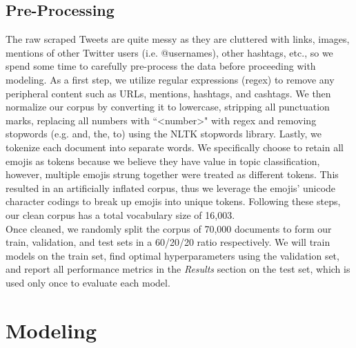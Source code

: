 \documentclass[11pt]{article}
\begin{document}
\subsection{Pre-Processing}

The raw scraped Tweets are quite messy as they are cluttered with links, images, mentions of other Twitter users (i.e. @usernames), other hashtags, etc., so we spend some time to carefully pre-process the data before proceeding with modeling. As a first step, we utilize regular expressions (regex) to remove any peripheral content such as URLs, mentions, hashtags, and cashtags. We then normalize our corpus by converting it to lowercase, stripping all punctuation marks, replacing all numbers with ``\textless number\textgreater" with regex and removing stopwords (e.g. and, the, to) using the NLTK stopwords library. Lastly, we tokenize each document into separate words. We specifically choose to retain all emojis as tokens because we believe they have value in topic classification, however, multiple emojis strung together were treated as different tokens. This resulted in an artificially inflated corpus, thus we leverage the emojis' unicode character codings to break up emojis into unique tokens. Following these steps, our clean corpus has a total vocabulary size of 16,003.
\\[5pt]
\noindent Once cleaned, we randomly split the corpus of 70,000 documents to form our train, validation, and test sets in a 60/20/20 ratio respectively. We will train models on the train set, find optimal hyperparameters using the validation set, and report all performance metrics in the \emph{Results} section on the test set, which is used only once to evaluate each model.







\section{Modeling}
\end{document}

